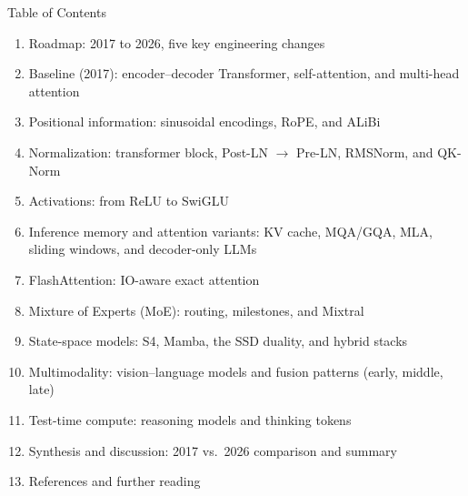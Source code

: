 \begin{frame}[allowframebreaks]{Table of Contents}
  \begin{enumerate}\itemsep0.15em
    \item Roadmap: 2017 to 2026, five key engineering changes
    \item Baseline (2017): encoder--decoder Transformer, self-attention, and multi-head attention
    \item Positional information: sinusoidal encodings, RoPE, and ALiBi
    \item Normalization: transformer block, Post-LN $\to$ Pre-LN, RMSNorm, and QK-Norm
    \item Activations: from ReLU to SwiGLU
    \item Inference memory and attention variants: KV cache, MQA/GQA, MLA, sliding windows, and decoder-only LLMs
    \item FlashAttention: IO-aware exact attention
    \item Mixture of Experts (MoE): routing, milestones, and Mixtral
    \item State-space models: S4, Mamba, the SSD duality, and hybrid stacks
    \item Multimodality: vision--language models and fusion patterns (early, middle, late)
    \framebreak
    \item Test-time compute: reasoning models and thinking tokens
    \item Synthesis and discussion: 2017 vs.\ 2026 comparison and summary
    \item References and further reading
  \end{enumerate}
\end{frame}
